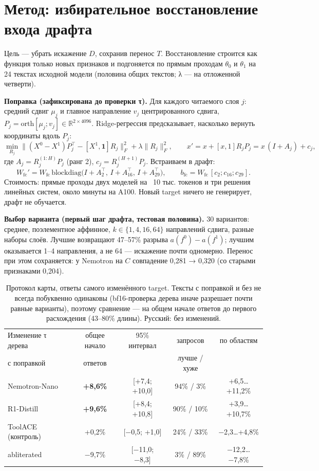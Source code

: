 \documentclass[11pt,a4paper]{article}
\newcommand{\pos}[1]{\textcolor{good}{#1}}
\newcommand{\negv}[1]{\textcolor{bad}{#1}}
\newcommand{\fc}{\mathrm{fc}}
\begin{document}
\section{Метод: избирательное восстановление входа драфта}

Цель --- убрать искажение $D$, сохранив перенос $T$. Восстановление строится как функция только новых признаков и
подгоняется по прямым проходам $\theta_0$ и $\theta_1$ на 24 текстах исходной модели (половина общих текстов; λ ---
на отложенной четверти).

\textbf{Поправка (зафиксирована до проверки τ).} Для каждого читаемого слоя $j$: средний сдвиг $\mu_j$ и главное
направление $v_j$ центрированного сдвига, $P_j=\mathrm{orth}[\mu_j;v_j]\in\mathbb R^{2\times4096}$. Ridge-регрессия
предсказывает, насколько вернуть координаты вдоль $P_j$:
\[
\min_{R_j}\big\|(X^0-X^1)P_j^\top-[X^1,\mathbf 1]R_j\big\|_F^2+\lambda\|R_j\|_F^2,\qquad
x'=x+[x,1]R_jP_j=x\,(I+A_j)+c_j ,
\]
где $A_j=R_j^{(1:H)}P_j$ (ранг 2), $c_j=R_j^{(H+1)}P_j$. Встраиваем в драфт:
\[
W_{\fc}'=W_{\fc}\,\mathrm{blockdiag}\big(I+A_2^\top,\,I+A_{16}^\top,\,I+A_{29}^\top\big),\qquad
b_{\fc}=W_{\fc}\,[c_2;c_{16};c_{29}] .
\]
Стоимость: прямые проходы двух моделей на ~10 тыс. токенов и три решения линейных систем, около минуты на A100.
Новый target ничего не генерирует, драфт не обучается.

\textbf{Выбор варианта (первый шаг драфта, тестовая половина).} 30 вариантов: среднее, поэлементное аффинное,
$k\in\{1,4,16,64\}$ направлений сдвига, разные наборы слоёв. Лучшие возвращают 47--57\% разрыва
$a(f^0)-a(f^1)$; лучшим оказывается 1--4 направления, а не 64 --- искажение почти одномерно. Перенос при этом
сохраняется: у Nemotron на $C$ совпадение 0,281 → 0,320 (со старыми признаками 0,204).

\begin{table}[H]
\centering\small
\begin{tabular}{@{}lcccc@{}}
\toprule
Изменение τ дерева & общее начало & 95\% интервал & запросов & по областям \\
с поправкой & ответов & & лучше / хуже & \\
\midrule
Nemotron-Nano & \pos{\textbf{+8,6\%}} & [+7,4; +10,0] & 94\% / 3\% & +6,5…+11,2\% \\
R1-Distill & \pos{\textbf{+9,6\%}} & [+8,4; +10,8] & 90\% / 10\% & +3,9…+10,7\% \\
ToolACE (контроль) & +0,2\% & [−0,5; +1,0] & 24\% / 33\% & −2,3…+4,8\% \\
abliterated & \negv{−9,7\%} & [−11,0; −8,3] & 3\% / 89\% & −12,2…−7,8\% \\
\bottomrule
\end{tabular}
\caption{Протокол карты, ответы самого изменённого target. Тексты с поправкой и без не всегда побуквенно одинаковы
(bf16-проверка дерева иначе разрешает почти равные варианты), поэтому сравнение --- на общем начале ответов до первого
расхождения (43--80\% длины). Русский: без изменений.}
\end{table}
\end{document}
